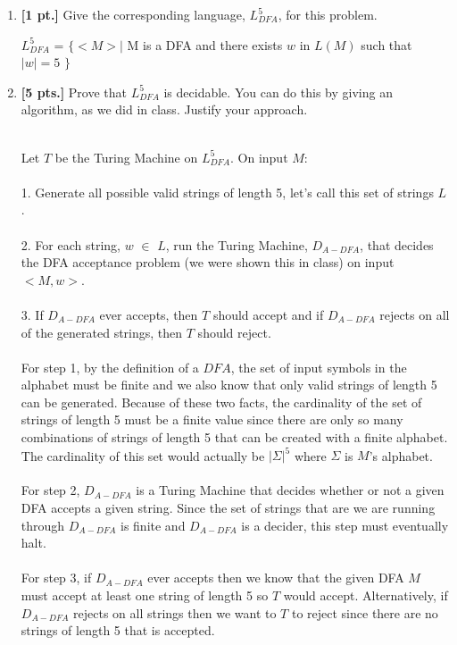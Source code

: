 \documentclass[11pt]{article}
\theoremstyle{definition}
\theoremstyle{theorem}
\newcommand{\solution}{\medskip\noindent{\color{blue}\textbf{Solution:}}}
\begin{document}
\begin{enumerate}[label=(\alph*)]

\item \textbf{[1 pt.]} Give the corresponding language, $L^5_{DFA}$, for this problem.

\solution

$L^5_{DFA}$ = $\{<M> |$ M is a DFA and there exists $w$ in $L(M)$ such that $|w| = 5$ $\}$


\item \textbf{[5 pts.]} Prove that $L^5_{DFA}$ is decidable. You can do this by giving an algorithm, as we did in class. Justify your approach.

\solution
\\
Let $T$ be the Turing Machine on $L^5_{DFA}$. On input $M$: \\ ~ \\
1. Generate all possible valid strings of length 5, let's call this set of strings $L$. \\ ~ \\
2. For each string, $w$ $\in$ $L$, run the Turing Machine, $D_{A-DFA}$, that decides the DFA acceptance problem (we were shown this in class) on input $<M, w>$. \\ ~ \\
3. If $D_{A-DFA}$ ever accepts, then $T$ should accept and if $D_{A-DFA}$ rejects on all of the generated strings, then $T$ should reject. \\ ~ \\


For step 1, by the definition of a $DFA$, the set of input symbols in the alphabet must be finite and we also know that only valid strings of length 5 can be generated.
Because of these two facts, the cardinality of the set of strings of length 5 must be a finite value since there are only so many combinations of strings of length 5 that can be created with a finite alphabet. The cardinality of this set would actually be $|\Sigma|^5$ where $\Sigma$ is $M$'s alphabet. \\ ~ \\
For step 2, $D_{A-DFA}$ is a Turing Machine that decides whether or not a given DFA accepts a given string. Since the set of strings that are we are running through $D_{A-DFA}$ is finite and $D_{A-DFA}$ is a decider, this step must eventually halt. \\ ~ \\
For step 3, if $D_{A-DFA}$ ever accepts then we know that the given DFA $M$ must accept at least one string of length 5 so $T$ would accept. Alternatively, if $D_{A-DFA}$ rejects on all strings then we want to $T$ to reject since there are no strings of length 5 that is accepted.



\end{enumerate}
\end{document}
